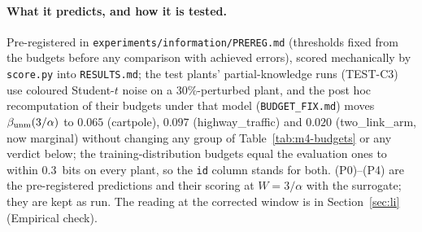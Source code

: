 \paragraph{What it predicts, and how it is tested.} Pre-registered in \texttt{experiments/information/PREREG.md}
(thresholds fixed from the budgets before any comparison with achieved errors), scored mechanically by
\texttt{score.py} into \texttt{RESULTS.md}; the test plants' partial-knowledge runs (TEST-C3) use coloured Student-$t$
noise on a $30\%$-perturbed plant, and the post hoc recomputation of their budgets under that model
(\texttt{BUDGET\_FIX.md}) moves $\beta_{\rm unm}(3/\alpha)$ to $0.065$ (cartpole), $0.097$ (highway\_traffic) and $0.020$
(two\_link\_arm, now marginal) without changing any group of Table~\ref{tab:m4-budgets} or any verdict below; the training-distribution budgets equal the evaluation ones to within
$0.3$~bits on every plant, so the \texttt{id} column stands for both.
\noindent{} (P0)--(P4) are the pre-registered predictions and their scoring at $W=3/\alpha$ with the
surrogate; they are kept as run. The reading at the corrected window is in Section~\ref{sec:li} (Empirical check).
